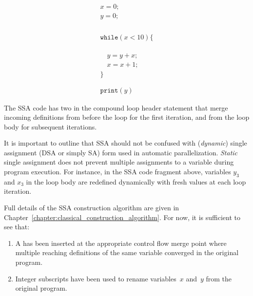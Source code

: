 \begin{minipage}{0.5\textwidth}
\begin{equation*}
\begin{array}{l}
x = 0;\\
y = 0;\\
~\\\\\\\\
\texttt{while} (x < 10) \{\\
~\\\\\\
\quad  y = y + x;\\
\quad  x = x + 1;\\
\}\\
~\\\\
\texttt{print}(y)
\end{array} 
\end{equation*}
\end{minipage}
\begin{minipage}{0.4\textwidth}
\end{minipage}
\bigskip

The SSA code has
two \phifuns in the compound loop header
statement that
merge incoming definitions from before the loop
for the first iteration,
and from the loop body for subsequent iterations.


It is important to outline that SSA should not be confused with (\emph{dynamic}) single assignment (DSA or simply SA) form used in automatic parallelization. \emph{Static} single assignment does not prevent multiple assignments to a variable
during program execution. For instance, in the SSA code fragment above,
variables $y_3$ and $x_3$ in the loop body are 
redefined dynamically with fresh values 
at each loop iteration. 

Full details of the SSA construction algorithm are given in 
Chapter~\ref{chapter:classical_construction_algorithm}. For now, it is sufficient to see that:
\begin{enumerate}
\item A \phifun has been
inserted at the appropriate control flow merge point where multiple reaching
definitions of the same variable converged in the original program.
\item Integer subscripts have been used to rename
variables~$x$ and~$y$ from the original program.
\end{enumerate}



